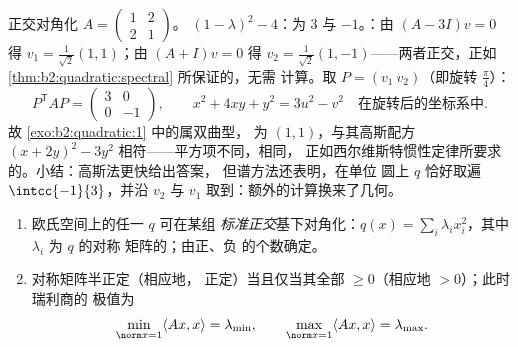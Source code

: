 \begin{example}[完整的谱计算]\label{ex:b2:quadratic:fullrun}
正交对角化 $A = \begin{pmatrix} 1 & 2\\ 2 &
1\end{pmatrix}$。 $(1 - \lambda)^2 -
4$：为 $3$ 与 $-1$。：由 $(A - 3I)v = 0$
得 $v_1 = \frac{1}{\sqrt2}(1,1)$；由 $(A + I)v = 0$ 得 $v_2
= \frac{1}{\sqrt2}(1,-1)$——两者正交，正如
\cref{thm:b2:quadratic:spectral} 所保证的，无需
计算。取 $P = (v_1\ v_2)$（即旋转
$\frac\pi4$）：
\[
P^{\mathsf T}AP = \begin{pmatrix} 3 & 0\\ 0 & -1
\end{pmatrix},
\qquad
x^2 + 4xy + y^2 = 3u^2 - v^2
\quad\text{在旋转后的坐标系中} .
\]
故 \cref{exo:b2:quadratic:1} 中的属双曲型，
为 $(1,1)$，与其高斯配方
$(x + 2y)^2 - 3y^2$ 相符——平方项不同，相同，
正如西尔维斯特惯性定律所要求的。小结：高斯法更快给出答案，
但谱方法还表明，在单位
圆上 $q$ 恰好取遍 $\intcc{-1}{3}$，并沿
$v_2$ 与 $v_1$ 取到：额外的计算换来了几何。
\end{example}

\begin{corollary}[主轴；正定性判别]\label{cor:b2:quadratic:principalaxes}
\begin{enumerate}
  \item 欧氏空间上的任一 $q$ 可在某组
        \emph{标准正交}基下对角化：$q(x) = \sum_i \lambda_i
        x_i^2$，其中 $\lambda_i$ 为 $q$ 的对称
        矩阵的；由正、负
        的个数确定。
  \item 对称矩阵半正定（相应地，
        正定）当且仅当其全部 $\geq 0$（相应地 $>
        0$）；此时瑞利商的
        极值为
        \[
        \min_{\norm x = 1} \langle Ax, x\rangle = \lambda_{\min},
        \qquad
        \max_{\norm x = 1} \langle Ax, x\rangle = \lambda_{\max} .
        \]
\end{enumerate}
\end{corollary}

